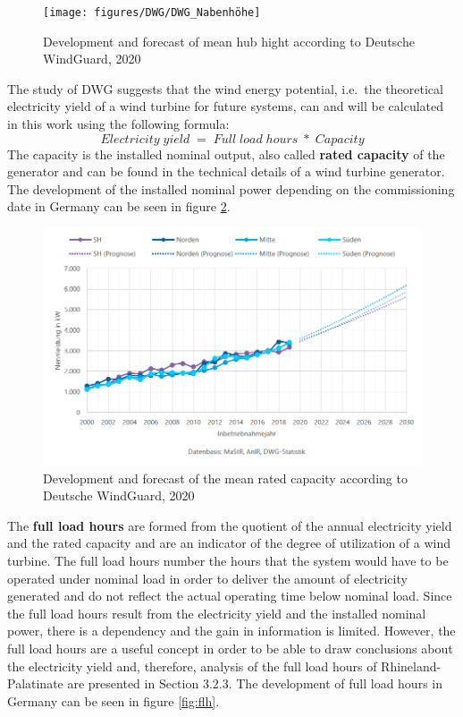 \documentclass[a4paper,11pt]{article}
\begin{document}
\begin{figure}

{\centering \texttt{[image: figures/DWG/DWG\_Nabenhöhe]} 

}

\caption{Development and forecast of mean hub hight according to Deutsche WindGuard, 2020}\label{fig:nabe}
\end{figure}
The study of DWG suggests that the wind energy potential, i.e.~the theoretical electricity yield of a wind turbine for future systems, can and will be calculated in this work using the following formula:
\[
Electricity\;yield\; =\; Full\;load\;hours\; *\; Capacity
\]
\newpage
The capacity is the installed nominal output, also called \textbf{rated capacity} of the generator and can be found in the technical details of a wind turbine generator. The development of the installed nominal power depending on the commissioning date in Germany can be seen in figure \ref{fig:capacity}.
\begin{figure}

{\centering \includegraphics[width=1\linewidth]{figures/DWG/DWG_Nennleistung} 

}

\caption{Development and forecast of the mean rated capacity according to Deutsche WindGuard, 2020}\label{fig:capacity}
\end{figure}
The \textbf{full load hours} are formed from the quotient of the annual electricity yield and the rated capacity and are an indicator of the degree of utilization of a wind turbine. The full load hours number the hours that the system would have to be operated under nominal load in order to deliver the amount of electricity generated and do not reflect the actual operating time below nominal load. Since the full load hours result from the electricity yield and the installed nominal power, there is a dependency and the gain in information is limited. However, the full load hours are a useful concept in order to be able to draw conclusions about the electricity yield and, therefore, analysis of the full load hours of Rhineland-Palatinate are presented in Section 3.2.3. The development of full load hours in Germany can be seen in figure \ref{fig:flh}.
\end{document}
